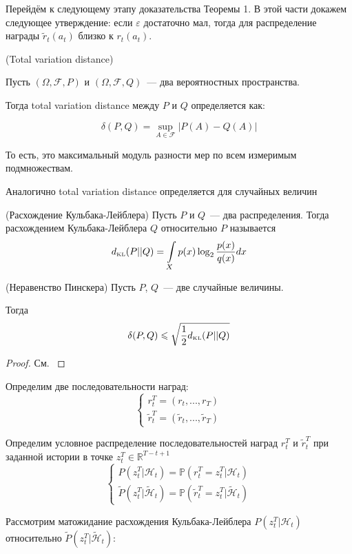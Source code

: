 \documentclass[a4paper]{article}
\newcommand{\Hh}{\mathcal{H}}
\newcommand{\R}{\mathbb{R}}
\newcommand{\dkl}{d_{\mbox{\tiny KL}}}
\newcommand{\ltwo}{\log_2 }
\def\eps{\varepsilon}
\begin{document}
Перейдём к следующему этапу доказательства Теоремы 1. В этой части докажем следующее утверждение: если $\eps$ достаточно мал, тогда для распределение награды $\tilde{r}_t(a_t)$ близко к $r_t(a_t)$.

\begin{definition}{(Total variation distance)}

Пусть $(\Omega,\mathcal{F},P)$ и $(\Omega,\mathcal{F},Q)$~--- два вероятностных пространства.

Тогда total variation distance между $P$ и $Q$ определяется как:

$$\delta(P,Q)=\sup\limits_{A\in\mathcal{F}}|P(A)-Q(A)|$$
	
То есть, это максимальный модуль разности мер по всем измеримым подмножествам.

Аналогично total variation distance определяется для случайных величин
\end{definition}

\begin{definition}{(Расхождение Кульбака-Лейблера)}
Пусть $P$ и $Q$~--- два распределения. Тогда расхождением Кульбака-Лейблера $Q$ относительно $P$ называется
$$\dkl(P||Q)=\int\limits_Xp(x)\ltwo\frac{p(x)}{q(x)}dx$$
\end{definition}

\begin{theorem}{(Неравенство Пинскера)}
Пусть $P$, $Q$~--- две случайные величины.

Тогда
$$\delta(P,Q)\leqslant\sqrt{\frac{1}{2}\dkl(P||Q)}$$
\end{theorem}

\begin{proof}
См. \cite{pinsker}
\end{proof}

Определим две последовательности наград:
$$\begin{cases}
r_t^T=(r_t,...,r_T)\\
\tilde{r}_t^T=(\tilde{r}_t,...,\tilde{r}_T)
\end{cases}$$

Определим условное распределение последовательностей наград $r_t^T$ и $\tilde{r}_t^T$ при заданной истории в точке $z_t^T\in\R^{T-t+1}$
$$
\begin{cases}
P(z_t^T|\Hh_t)=\mathbb{P}(r_t^T=z_t^T\big| \Hh_t)\\
\tilde{P}(z_t^T\big|\tilde{\Hh}_t)=\mathbb{P}(\tilde{r}_t^T=z_t^T\big|\tilde{\Hh}_t)
\end{cases}
$$

Рассмотрим матожидание расхождения Кульбака-Лейблера $P(z_t^T|\Hh_t)$ относительно $\tilde{P}(z_t^T|\tilde{\Hh}_t)$:
\end{document}

